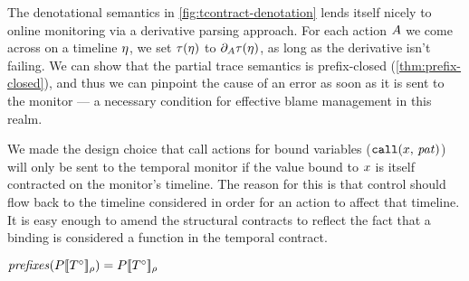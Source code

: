 The denotational semantics in \autoref{fig:tcontract-denotation} lends itself nicely to online monitoring via a derivative parsing approach.
%
For each action $A$ we come across on a timeline $\eta$, we set $\tau(\eta)$ to $\partial_{A}{\tau(\eta)}$, as long as the derivative isn't failing.
%
We can show that the partial trace semantics is prefix-closed (\autoref{thm:prefix-closed}), and thus we can pinpoint the cause of an error as soon as it is sent to the monitor --- a necessary condition for effective blame management in this realm.

We made the design choice that call actions for bound variables (${\tt call}(x,\, \mathit{pat})$) will only be sent to the temporal monitor if the value bound to $x$ is itself contracted on the monitor's timeline.
%
The reason for this is that control should flow back to the timeline considered in order for an action to affect that timeline.
%
It is easy enough to amend the structural contracts to reflect the fact that a binding is considered a function in the temporal contract.

\begin{theorem}\label{thm:prefix-closed}
  $\mathit{prefixes}(P[\![ T^\circ ]\!]_{\rho}) = P[\![ T^\circ ]\!]_{\rho}$
\end{theorem}

